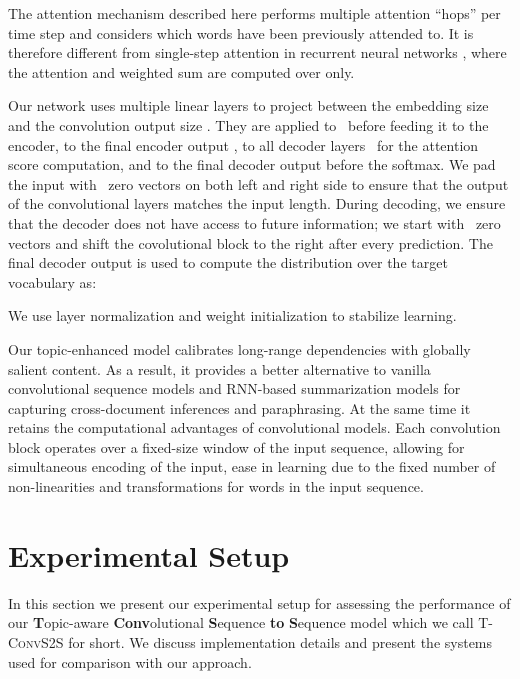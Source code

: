 \documentclass[11pt,a4paper]{article}
\begin{document}
The attention mechanism described here performs multiple attention
``hops'' per time step and considers which words have been previously
attended to. It is therefore different from single-step attention in
recurrent neural networks \cite{bahdanau-arxiv14}, where the attention
and weighted sum are computed over  only.

Our network uses multiple linear layers to project between the
embedding size  and the convolution output size . They are
applied to~ before feeding it to the encoder, to the final
encoder output , to all decoder layers~
for the attention score computation, and to the final decoder output
 before the softmax.  We pad the input with~ zero
vectors on both left and right side to ensure that the output of the
convolutional layers matches the input length. During decoding, we
ensure that the decoder does not have access to future information; we
start with ~zero vectors and shift the covolutional block to the
right after every prediction. The final decoder output 
is used to compute the distribution over the target vocabulary  as:

We use layer normalization and weight initialization to
stabilize learning. 


Our topic-enhanced model calibrates long-range dependencies with
globally salient content. As a result, it provides a better
alternative to vanilla convolutional sequence models
\cite{convseq2seq} and RNN-based summarization models \cite{see-acl17}
for capturing cross-document inferences and paraphrasing.  At the same
time it retains the computational advantages of convolutional
models. Each convolution block operates over a fixed-size window of
the input sequence, allowing for simultaneous encoding of the input,
ease in learning due to the fixed number of non-linearities and
transformations for words in the input sequence.








 
\section{Experimental Setup}
\label{sec:setup}

In this section we present our experimental setup for assessing the
performance of our \textbf{T}opic-aware \textbf{Conv}olutional
\textbf{S}equence \textbf{to} \textbf{S}equence model which we call
\textsc{T-ConvS2S} for short.  We discuss implementation details and
present the systems used for comparison with our approach.
\end{document}
